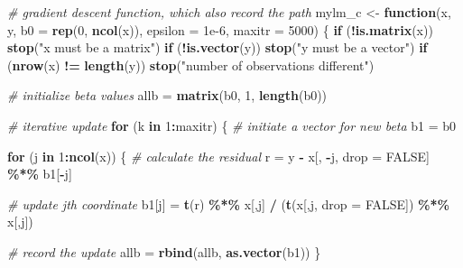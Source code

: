 \documentclass[
]{book}
\newenvironment{Shaded}{\begin{snugshade}}{\end{snugshade}}
\newcommand{\AttributeTok}[1]{\textcolor[rgb]{0.13,0.29,0.53}{#1}}
\newcommand{\CommentTok}[1]{\textcolor[rgb]{0.56,0.35,0.01}{\textit{#1}}}
\newcommand{\ConstantTok}[1]{\textcolor[rgb]{0.56,0.35,0.01}{#1}}
\newcommand{\ControlFlowTok}[1]{\textcolor[rgb]{0.13,0.29,0.53}{\textbf{#1}}}
\newcommand{\DecValTok}[1]{\textcolor[rgb]{0.00,0.00,0.81}{#1}}
\newcommand{\FloatTok}[1]{\textcolor[rgb]{0.00,0.00,0.81}{#1}}
\newcommand{\FunctionTok}[1]{\textcolor[rgb]{0.13,0.29,0.53}{\textbf{#1}}}
\newcommand{\NormalTok}[1]{#1}
\newcommand{\OtherTok}[1]{\textcolor[rgb]{0.56,0.35,0.01}{#1}}
\newcommand{\SpecialCharTok}[1]{\textcolor[rgb]{0.81,0.36,0.00}{\textbf{#1}}}
\newcommand{\StringTok}[1]{\textcolor[rgb]{0.31,0.60,0.02}{#1}}
\theoremstyle{definition}
\theoremstyle{definition}
\theoremstyle{definition}
\theoremstyle{definition}
\theoremstyle{remark}
\begin{document}
\begin{Shaded}
\begin{Highlighting}[]
  \CommentTok{\# gradient descent function, which also record the path}
\NormalTok{  mylm\_c }\OtherTok{\textless{}{-}} \ControlFlowTok{function}\NormalTok{(x, y, }\AttributeTok{b0 =} \FunctionTok{rep}\NormalTok{(}\DecValTok{0}\NormalTok{, }\FunctionTok{ncol}\NormalTok{(x)), }\AttributeTok{epsilon =} \FloatTok{1e{-}6}\NormalTok{, }\AttributeTok{maxitr =} \DecValTok{5000}\NormalTok{)}
\NormalTok{  \{}
    \ControlFlowTok{if}\NormalTok{ (}\SpecialCharTok{!}\FunctionTok{is.matrix}\NormalTok{(x)) }\FunctionTok{stop}\NormalTok{(}\StringTok{"x must be a matrix"}\NormalTok{)}
    \ControlFlowTok{if}\NormalTok{ (}\SpecialCharTok{!}\FunctionTok{is.vector}\NormalTok{(y)) }\FunctionTok{stop}\NormalTok{(}\StringTok{"y must be a vector"}\NormalTok{)}
    \ControlFlowTok{if}\NormalTok{ (}\FunctionTok{nrow}\NormalTok{(x) }\SpecialCharTok{!=} \FunctionTok{length}\NormalTok{(y)) }\FunctionTok{stop}\NormalTok{(}\StringTok{"number of observations different"}\NormalTok{)}
    
    \CommentTok{\# initialize beta values}
\NormalTok{    allb }\OtherTok{=} \FunctionTok{matrix}\NormalTok{(b0, }\DecValTok{1}\NormalTok{, }\FunctionTok{length}\NormalTok{(b0))}
    
    \CommentTok{\# iterative update}
    \ControlFlowTok{for}\NormalTok{ (k }\ControlFlowTok{in} \DecValTok{1}\SpecialCharTok{:}\NormalTok{maxitr)}
\NormalTok{    \{}
      \CommentTok{\# initiate a vector for new beta}
\NormalTok{      b1 }\OtherTok{=}\NormalTok{ b0}
      
      \ControlFlowTok{for}\NormalTok{ (j }\ControlFlowTok{in} \DecValTok{1}\SpecialCharTok{:}\FunctionTok{ncol}\NormalTok{(x))}
\NormalTok{      \{}
        \CommentTok{\# calculate the residual}
\NormalTok{        r }\OtherTok{=}\NormalTok{ y }\SpecialCharTok{{-}}\NormalTok{ x[, }\SpecialCharTok{{-}}\NormalTok{j, drop }\OtherTok{=} \ConstantTok{FALSE}\NormalTok{] }\SpecialCharTok{\%*\%}\NormalTok{ b1[}\SpecialCharTok{{-}}\NormalTok{j]}
        
        \CommentTok{\# update jth coordinate}
\NormalTok{        b1[j] }\OtherTok{=} \FunctionTok{t}\NormalTok{(r) }\SpecialCharTok{\%*\%}\NormalTok{ x[,j] }\SpecialCharTok{/}\NormalTok{ (}\FunctionTok{t}\NormalTok{(x[,j, }\AttributeTok{drop =} \ConstantTok{FALSE}\NormalTok{]) }\SpecialCharTok{\%*\%}\NormalTok{ x[,j])}
        
        \CommentTok{\# record the update}
\NormalTok{        allb }\OtherTok{=} \FunctionTok{rbind}\NormalTok{(allb, }\FunctionTok{as.vector}\NormalTok{(b1))}
\NormalTok{      \}}


\end{Highlighting}
\end{Shaded}
\end{document}
